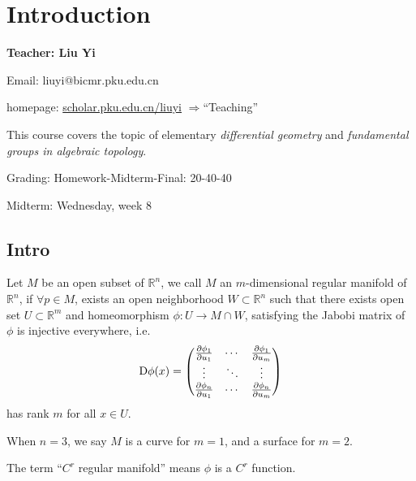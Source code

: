 \section{Introduction}
\label{sec:Introduction}
\begin{center}
	\sffamily\large\bfseries Teacher: Liu Yi

	Email: liuyi@bicmr.pku.edu.cn

	homepage: \url{scholar.pku.edu.cn/liuyi} $\Rightarrow$``Teaching''
\end{center}

This course covers the topic of elementary \textit{differential geometry}
and \textit{fundamental groups in algebraic topology}.

Grading: Homework-Midterm-Final: 20-40-40

Midterm: Wednesday, week 8

\subsection{Intro}
\label{sub:Intro}
\begin{definition}[Manifold]
	Let $M$ be an open subset of $\mathbb{R}^n$, we call $M$ an $m$-dimensional regular
	manifold of $\mathbb{R}^n$, if $\forall p\in M$, exists an open neighborhood
	$W \subset \mathbb{R}^n$ such that there exists open set $U \subset \mathbb{R}^m$
	and homeomorphism $\phi: U\to M \cap W$, satisfying the Jabobi matrix of $\phi$
	is injective everywhere, i.e.
	\[
	\mathop{}\!\mathrm{D}\phi(x) = \begin{pmatrix}
		\frac{\partial\phi_1}{\partial u_1} &\cdots &\frac{\partial\phi_1}{\partial u_m}\\
		\vdots &\ddots &\vdots \\
		\frac{\partial\phi_n}{\partial u_1} &\cdots &\frac{\partial\phi_n}{\partial u_m}
	\end{pmatrix}
	\]
	has rank $m$ for all  $x\in U$.
\end{definition}
When $n=3$, we say $M$ is a curve for $m=1$, and a surface for $m=2$.
\begin{remark}
    The term ``$C^r$ regular manifold'' means $\phi$ is a  $C^r$ function.
\end{remark}

